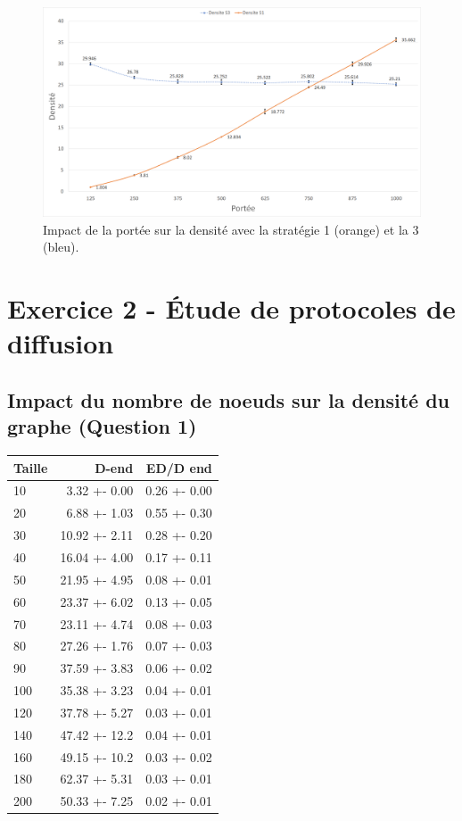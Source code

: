 \documentclass[a4paper]{article}
\begin{document}
\begin{figure}[H]
  \centering
  \includegraphics[width=\textwidth]{images/q10-11-s1and2.png}
  \caption{Impact de la portée sur la densité avec la stratégie 1 (orange) et la 3 (bleu).}
  \label{fig:S1-S3-portee}
\end{figure}


\section{Exercice 2 - Étude de protocoles de diffusion}
\subsection{Impact du nombre de noeuds sur la densité du
  graphe (Question 1)}
\begin{table}[H]
  \centering
  \begin{tabular}{|l|r|r|}
    \hline
    Taille & D-end & ED/D end \\ \hline
    10  &  3.32 +- 0.00 & 0.26 +- 0.00 \\ \hline
     20  &  6.88 +- 1.03 & 0.55 +- 0.30 \\ \hline
     30  & 10.92 +- 2.11 & 0.28 +- 0.20 \\ \hline
     40  & 16.04 +- 4.00 & 0.17 +- 0.11 \\ \hline
     50  & 21.95 +- 4.95 & 0.08 +- 0.01 \\ \hline
     60  & 23.37 +- 6.02 & 0.13 +- 0.05 \\ \hline
     70  & 23.11 +- 4.74 & 0.08 +- 0.03 \\ \hline
     80  & 27.26 +- 1.76 & 0.07 +- 0.03 \\ \hline
     90  & 37.59 +- 3.83 & 0.06 +- 0.02 \\ \hline
     100 & 35.38 +- 3.23 & 0.04 +- 0.01 \\ \hline
     120 & 37.78 +- 5.27 & 0.03 +- 0.01 \\ \hline
     140 & 47.42 +- 12.2 & 0.04 +- 0.01 \\ \hline
     160 & 49.15 +- 10.2 & 0.03 +- 0.02 \\ \hline
     180 & 62.37 +- 5.31 & 0.03 +- 0.01 \\ \hline
     200 & 50.33 +- 7.25 & 0.02 +- 0.01 \\ \hline
  \end{tabular}
\end{table}
\end{document}
